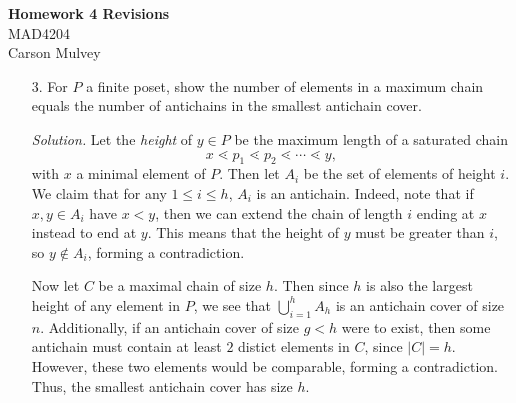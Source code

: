 \documentclass[11pt,letterpaper]{article}
\newenvironment{solution}{\color{blue}\textit{Solution.}}{\color{black}}
\begin{document}

\flushleft

\begin{center}
    \begin{large}
        \textbf{Homework 4 Revisions} \\
        MAD4204 \\
        Carson Mulvey
    \end{large}
\end{center}

\pagestyle{empty}


\flushleft


\begin{enumerate}
	\item[3.] For $P$ a finite poset, show the number of elements in a maximum chain equals the number of antichains in the smallest antichain cover.

	\begin{solution}
		Let the \textit{height} of $y\in P$ be the maximum length of a saturated chain
		\[
			x\lessdot p_1 \lessdot p_2 \lessdot \cdots \lessdot y,
		\]
		with $x$ a minimal element of $P$. Then let $A_i$ be the set of elements of height $i$. We claim that for any $1\leq i\leq h$, $A_i$ is an antichain. Indeed, note that if $x,y\in A_i$ have $x<y$, then we can extend the chain of length $i$ ending at $x$ instead to end at $y$. This means that the height of $y$ must be greater than $i$, so $y\notin{A_i}$, forming a contradiction.
		
		Now let $C$ be a maximal chain of size $h$. Then since $h$ is also the largest height of any element in $P$, we see that $\bigcup_{i=1}^h{A_h}$ is an antichain cover of size $n$. Additionally, if an antichain cover of size $g<h$ were to exist, then some antichain must contain at least $2$ distict elements in $C$, since $|C|=h$. However, these two elements would be comparable, forming a contradiction. Thus, the smallest antichain cover has size $h$.
	\end{solution}
\end{enumerate}
\end{document}

